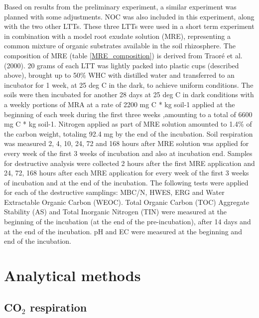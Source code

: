\documentclass[12pt]{report}
\begin{document}
	Based on results from the preliminary experiment, a similar experiment was planned with some adjustments. NOC was also included in this experiment, along with the two other LTTs.
	These three LTTs were used in a short term experiment in combination with a model root exudate solution (MRE), representing a common mixture of organic substrates available in the soil rhizosphere. The composition of MRE (table \ref{MRE_composition}) is derived from Traoré et al. (2000).   
	20 grams of each LTT was lightly packed into plastic cups (described above), brought up to 50\% WHC with distilled water and transferred to an incubator for 1 week, at 25 deg C in the dark, to achieve uniform conditions. The soils were then incubated for another 28 days at 25 deg C in dark conditions with a weekly portions of MRA at a rate of 2200 mg C * kg soil-1  applied at the beginning of each week during the first three weeks ,amounting to a total of 6600 mg C * kg soil-1. Nitrogen applied as part of MRE solution amounted to 1.4\% of the carbon weight,  totaling 92.4 mg by the end of the incubation. Soil respiration was measured 2, 4, 10, 24, 72 and 168 hours after MRE solution was applied for every week of the first 3 weeks of incubation and also at incubation end. Samples for destructive analysis were collected 2 hours after the first MRE application and 24, 72, 168 hours after  each MRE application for every week of the first 3 weeks of incubation and at the end of the incubation. The following tests were applied for each of the destructive samplings: MBC/N, HWES, ERG and Water Extractable Organic Carbon (WEOC). Total Organic Carbon (TOC) Aggregate Stability (AS) and Total Inorganic Nitrogen (TIN) were measured at the beginning of the incubation (at the end of the pre-incubation), after 14 days and at the end of the incubation. pH and EC were measured at the beginning and end of the incubation.
	
    
    
   
\section{Analytical methods}
    
    \subsection{CO$_2$ respiration}
    	
\end{document}
